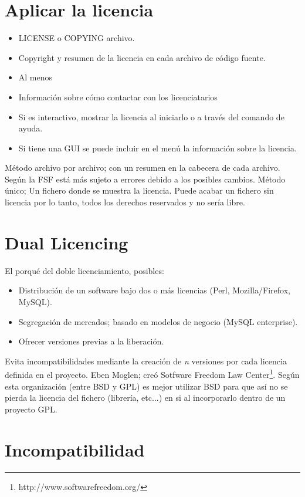 \documentclass{scrartcl}
\begin{document}
\section{Aplicar la licencia}

\begin{itemize}
    \item LICENSE o COPYING archivo.
    \item Copyright y resumen de la licencia en cada archivo de código fuente.
    \item Al menos 
    \item Información sobre cómo contactar con los licenciatarios
    \item Si es interactivo, mostrar la licencia al iniciarlo o a través del comando de ayuda.
    \item Si tiene una GUI se puede incluir en el menú la información sobre la licencia.
\end{itemize}

Método archivo por archivo; con un resumen en la cabecera de cada archivo. Según la FSF está más sujeto a errores debido a los posibles cambios.
Método único; Un fichero donde se muestra la licencia. Puede acabar un fichero sin licencia por lo tanto, todos los derechos reservados y no sería libre.

\section{Dual Licencing}

El porqué del doble licenciamiento, posibles:
\begin{itemize}
    \item Distribución de un software bajo dos o más licencias (Perl, Mozilla/Firefox, MySQL).
    \item Segregación de mercados; basado en modelos de negocio (MySQL enterprise).
    \item Ofrecer versiones previas a la liberación.
\end{itemize}

Evita incompatibilidades mediante la creación de \emph{n} versiones por cada licencia definida en el proyecto.
Eben Moglen; creó Sotfware Freedom Law Center\footnote{http://www.softwarefreedom.org/}. Según esta organización (entre BSD y GPL) es mejor utilizar BSD para que así no se pierda la licencia del fichero (librería, etc...) en si al incorporarlo dentro de un proyecto GPL.

\section{Incompatibilidad}
\end{document}
